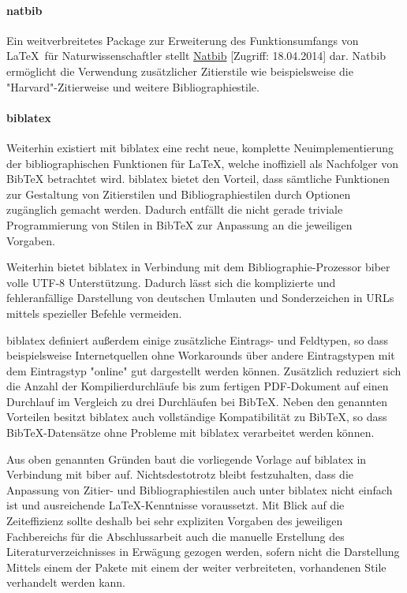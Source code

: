 		\paragraph{natbib}
		\noindent Ein weitverbreitetes Package zur Erweiterung des Funktionsumfangs von \LaTeX\ für Naturwissenschaftler stellt \href{http://ftp.gwdg.de/pub/ctan/macros/latex/contrib/natbib/natbib.pdf}{Natbib} [Zugriff: 18.04.2014] dar. Natbib ermöglicht die Verwendung zusätzlicher Zitierstile wie beispielsweise die "{}Harvard"{}-Zitierweise und weitere Bibliographiestile.
		
		\paragraph{biblatex}
		\noindent Weiterhin existiert mit biblatex eine recht neue, komplette Neuimplementierung der bibliographischen Funktionen für \LaTeX, welche inoffiziell als Nachfolger von BibTeX betrachtet wird. biblatex bietet den Vorteil, dass sämtliche Funktionen zur Gestaltung von Zitierstilen und Bibliographiestilen durch Optionen zugänglich gemacht werden. Dadurch entfällt die nicht gerade triviale Programmierung von Stilen in BibTeX zur Anpassung an die jeweiligen Vorgaben.
		
		Weiterhin bietet biblatex in Verbindung mit dem Bibliographie-Prozessor biber volle UTF-8 Unterstützung. Dadurch lässt sich die komplizierte und fehleranfällige Darstellung von deutschen Umlauten und Sonderzeichen in URLs mittels spezieller Befehle vermeiden.
		
		biblatex definiert außerdem einige zusätzliche Eintrags- und Feldtypen, so dass beispielsweise Internetquellen ohne Workarounds über andere Eintragstypen mit dem Eintragstyp "{}online"{} gut dargestellt werden können. Zusätzlich reduziert sich die Anzahl der Kompilierdurchläufe bis zum fertigen PDF-Dokument auf einen Durchlauf im Vergleich zu drei Durchläufen bei BibTeX. Neben den genannten Vorteilen besitzt biblatex auch vollständige Kompatibilität zu BibTeX, so dass BibTeX-Datensätze ohne Probleme mit biblatex verarbeitet werden können.
		
		Aus oben genannten Gründen baut die vorliegende Vorlage auf biblatex in Verbindung mit biber auf.
		Nichtsdestotrotz bleibt festzuhalten, dass die Anpassung von Zitier- und Bibliographiestilen auch unter biblatex nicht einfach ist und ausreichende \LaTeX-Kenntnisse voraussetzt. Mit Blick auf die Zeiteffizienz sollte deshalb bei sehr expliziten Vorgaben des jeweiligen Fachbereichs für die Abschlussarbeit auch die manuelle Erstellung des Literaturverzeichnisses in Erwägung gezogen werden, sofern nicht die Darstellung Mittels einem der Pakete mit einem der weiter verbreiteten, vorhandenen Stile verhandelt werden kann.
		
